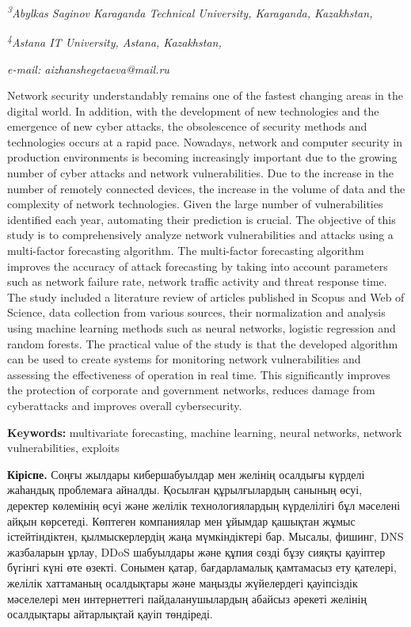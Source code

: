 \documentclass[
]{article}
\begin{document}
\emph{\textsuperscript{3}Abylkas Saginov Karaganda Technical University,
Karaganda, Kazakhstan,}

\emph{\textsuperscript{4}Astana IT University, Astana, Kazakhstan,}

\emph{e-mail: aizhanshegetaeva@mail.ru}

Network security understandably remains one of the fastest changing
areas in the digital world. In addition, with the development of new
technologies and the emergence of new cyber attacks, the obsolescence of
security methods and technologies occurs at a rapid pace. Nowadays,
network and computer security in production environments is becoming
increasingly important due to the growing number of cyber attacks and
network vulnerabilities. Due to the increase in the number of remotely
connected devices, the increase in the volume of data and the complexity
of network technologies. Given the large number of vulnerabilities
identified each year, automating their prediction is crucial. The
objective of this study is to comprehensively analyze network
vulnerabilities and attacks using a multi-factor forecasting algorithm.
The multi-factor forecasting algorithm improves the accuracy of attack
forecasting by taking into account parameters such as network failure
rate, network traffic activity and threat response time. The study
included a literature review of articles published in Scopus and Web of
Science, data collection from various sources, their normalization and
analysis using machine learning methods such as neural networks,
logistic regression and random forests. The practical value of the study
is that the developed algorithm can be used to create systems for
monitoring network vulnerabilities and assessing the effectiveness of
operation in real time. This significantly improves the protection of
corporate and government networks, reduces damage from cyberattacks and
improves overall cybersecurity.

\textbf{Keywords:} multivariate forecasting, machine learning, neural
networks, network vulnerabilities, exploits

\textbf{Кіріспе.} Соңғы жылдары кибершабуылдар мен желінің осалдығы
күрделі жаһандық проблемаға айналды. Қосылған құрылғылардың санының
өсуі, деректер көлемінің өсуі және желілік технологиялардың күрделілігі
бұл мәселені айқын көрсетеді. Көптеген компаниялар мен ұйымдар қашықтан
жұмыс істейтіндіктен, қылмыскерлердің жаңа мүмкіндіктері бар. Мысалы,
фишинг, DNS жазбаларын ұрлау, DDoS шабуылдары және құпия сөзді бұзу
сияқты қауіптер бүгінгі күні өте өзекті. Сонымен қатар, бағдарламалық
қамтамасыз ету қателері, желілік хаттаманың осалдықтары және маңызды
жүйелердегі қауіпсіздік мәселелері мен интернеттегі пайдаланушылардың
абайсыз әрекеті желінің осалдықтары айтарлықтай қауіп төндіреді.
\end{document}
